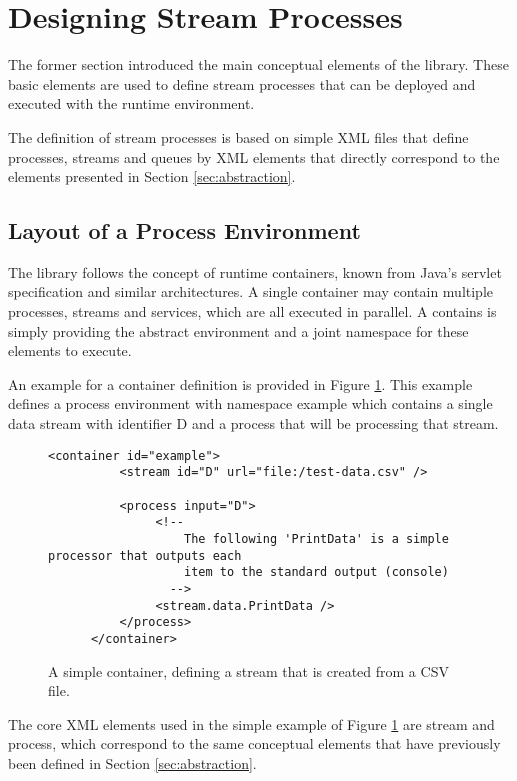 \section{Designing Stream Processes}
The former section introduced the main conceptual elements of the \streams library.
These basic elements are used to define stream processes that can be deployed and
executed with the \streams runtime environment.

The definition of stream processes is based on simple XML files that define processes,
streams and queues by XML elements that directly correspond to the elements presented
in Section \ref{sec:abstraction}.


\subsection{Layout of a Process Environment}
The \streams library follows the concept of runtime containers, known from Java's
servlet specification and similar architectures. A single container may contain
multiple processes, streams and services, which are all executed in parallel. A
contains is simply providing the abstract environment and a joint namespace for
these elements to execute.

An example for a container definition is provided in Figure \ref{fig:simpleContainer}.
This example defines a process environment with namespace {\ttfamily example} which
contains a single data stream with identifier {\ttfamily D} and a process that will
be processing that stream.

\begin{figure}[h!]
	\begin{lstlisting}[showstringspaces=false]
      <container id="example">
          <stream id="D" url="file:/test-data.csv" />

          <process input="D">
               <!--
                   The following 'PrintData' is a simple processor that outputs each
                   item to the standard output (console)
                 -->
               <stream.data.PrintData />
          </process>
      </container>
	\end{lstlisting}
	\caption{\label{fig:simpleContainer}A simple container, defining a stream that is created from a CSV file.}
\end{figure}

The core XML elements used in the simple example of Figure \ref{fig:simpleContainer}
are {\ttfamily stream} and {\ttfamily process}, which correspond to the same 
conceptual elements that have previously been defined in Section \ref{sec:abstraction}.

